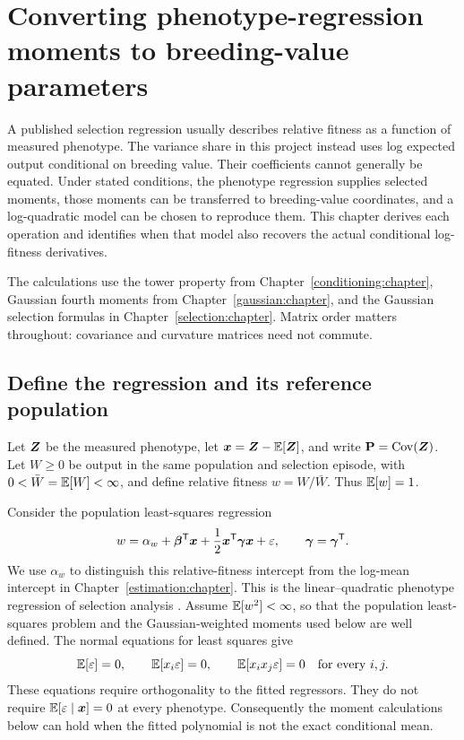 \chapter{Converting phenotype-regression moments to breeding-value parameters}
\label{conversion:chapter}

A published selection regression usually describes relative fitness as a
function of measured phenotype. The variance share in this project instead
uses log expected output conditional on breeding value. Their coefficients
cannot generally be equated. Under stated conditions, the phenotype
regression supplies selected moments, those moments can be transferred to
breeding-value coordinates, and a log-quadratic model can be chosen to
reproduce them. This chapter derives each operation and identifies when that
model also recovers the actual conditional log-fitness derivatives.

The calculations use the tower property from
Chapter~\ref{conditioning:chapter}, Gaussian fourth moments from
Chapter~\ref{gaussian:chapter}, and the Gaussian selection formulas in
Chapter~\ref{selection:chapter}. Matrix order matters throughout: covariance
and curvature matrices need not commute.

\section{Define the regression and its reference population}
\label{conversion:regression}

Let \(\boldsymbol{Z}\) be the measured phenotype, let
\(\boldsymbol{x}=\boldsymbol{Z}-\mathbb E[\boldsymbol{Z}]\), and write
\(\mathbf{P}=\operatorname{Cov}(\boldsymbol{Z})\). Let \(W\geq0\) be output in the same population and
selection episode, with \(0<\bar W=\mathbb E[W]<\infty\), and define relative
fitness \(w=W/\bar W\). Thus \(\mathbb E[w]=1\).

Consider the population least-squares regression
\begin{equation}
 w=\alpha_w+\boldsymbol{\beta}^{\mathsf T}\boldsymbol{x}
     +\frac12\boldsymbol{x}^{\mathsf T}\boldsymbol{\gamma}\boldsymbol{x}+\varepsilon,
 \qquad \boldsymbol{\gamma}=\boldsymbol{\gamma}^{\mathsf T}.
 \label{conversion:regression_model}
\end{equation}
We use \(\alpha_w\) to distinguish this relative-fitness intercept from the
log-mean intercept in Chapter~\ref{estimation:chapter}. This is the
linear--quadratic phenotype regression of selection analysis
\citep{LandeArnold1983}. Assume \(\mathbb E[w^2]<\infty\), so that the population
least-squares problem and the Gaussian-weighted moments used below are
well defined. The normal equations for least squares give
\begin{equation}
 \mathbb E[\varepsilon]=0,\qquad
 \mathbb E[x_i\varepsilon]=0,\qquad
 \mathbb E[x_ix_j\varepsilon]=0
 \quad\hbox{for every }i,j.
 \label{conversion:normal_equations}
\end{equation}
These equations require orthogonality to the fitted regressors. They do not
require \(\mathbb E[\varepsilon\mid\boldsymbol{x}]=0\) at every phenotype. Consequently
the moment calculations below can hold when the fitted polynomial is not the
exact conditional mean.

